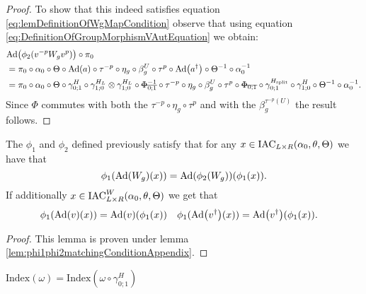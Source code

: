 \documentclass[11pt,a4paper,twoside]{article}
\numberwithin{equation}{section}
\begin{document}
\begin{proof}
	To show that this indeed satisfies equation \eqref{eq:lemDefinitionOfWgMapCondition} observe that using equation \eqref{eq:DefinitionOfGroupMorphismVAutEquation} we obtain:
	\begin{align}
		&\Ad{\phi_2(v^{-p}W_g v^{p})}\circ\pi_0\\
		&=\pi_0\circ \alpha_0\circ\Theta\circ\Ad{a}\circ\tau^{-p}\circ\eta_g\circ\beta_g^U\circ\tau^p\circ\Ad{a^{\dagger}}\circ\Theta^{-1}\circ\alpha_0^{-1}\\
		&=\pi_0\circ \alpha_0\circ\Theta\circ\gamma^H_{0;1}\circ\gamma^{H_L}_{1;0}\otimes\gamma^{H_L}_{1;0}\circ\stkout{\Phi_{0;1}^{-1}}\circ\tau^{-p}\circ\eta_g\circ\beta_g^U\circ\tau^p\circ\stkout{\Phi_{0;1}}\circ\gamma^{\Hsplit}_{0;1}\circ\gamma^H_{1;0}\circ\Theta^{-1}\circ\alpha_0^{-1}.
	\end{align}
	Since $\Phi$ commutes with both the $\tau^{-p}\circ\eta_g\circ\tau^p$ and with the $\beta_g^{\tau^{-p}(U)}$ the result follows.
\end{proof}
\begin{lemma}\label{lem:phi1phi2matchingCondition}
	The $\phi_1$ and $\phi_2$ defined previously satisfy that for any $x\in\textrm{IAC}_{L\times R}(\alpha_0,\theta,\Theta)$ we have that
	\begin{equation}
		\phi_1(\Ad{W_g}(x))=\Ad{\phi_2(W_g)}(\phi_1(x)).
	\end{equation}
	If additionally $x\in\textrm{IAC}_{L\times R}^W(\alpha_0,\theta,\Theta)$ we get that
	\begin{align}
		\phi_1(\Ad{v}(x))&=\Ad{v}(\phi_1(x))&\phi_1(\Ad{v^\dagger}(x))&=\Ad{v^\dagger}(\phi_1(x)).
	\end{align}
\end{lemma}
\begin{proof}
	This lemma is proven under lemma \ref{lem:phi1phi2matchingConditionAppendix}.
\end{proof}
\begin{theorem}\label{thrm:IndexInvariantUnderLGA}
	$\textrm{Index}(\omega)=\textrm{Index}(\omega\circ\gamma^H_{0;1})$
\end{theorem}
\end{document}
